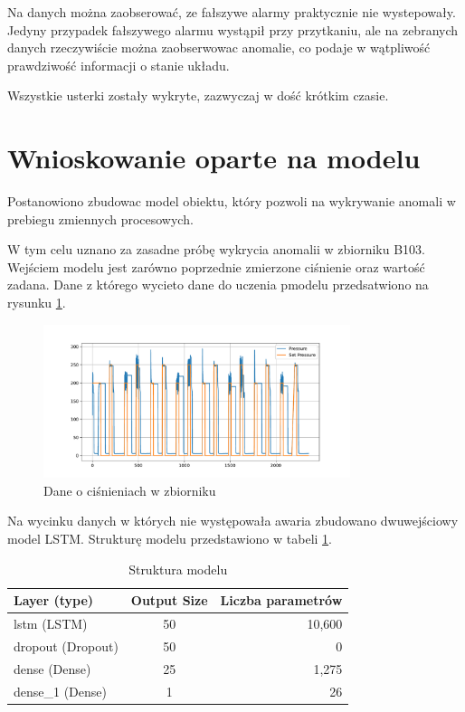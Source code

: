 \documentclass[a4paper,12pt]{article}
\begin{document}
Na danych można zaobserować, ze fałszywe alarmy praktycznie nie wystepowały. Jedyny przypadek fałszywego alarmu wystąpił przy przytkaniu, ale na zebranych danych rzeczywiście można zaobserwowac anomalie, co podaje w wątpliwość prawdziwość informacji o stanie układu.

Wszystkie usterki zostały wykryte, zazwyczaj w dość krótkim czasie.

\section{Wnioskowanie oparte na modelu}


Postanowiono zbudowac model obiektu, który pozwoli na wykrywanie anomali w prebiegu zmiennych procesowych. 

W tym celu uznano za zasadne próbę wykrycia anomalii w zbiorniku B103. Wejściem modelu jest zarówno poprzednie zmierzone ciśnienie oraz wartość zadana. Dane z którego wycieto dane do uczenia pmodelu przedsatwiono na rysunku \ref{fig:model_data}.

\begin{figure}[H]
        \centering
        \includegraphics[width=0.8\textwidth]{model_data.pdf}
        \caption{Dane o ciśnieniach w zbiorniku}
        \label{fig:model_data}
\end{figure}

Na wycinku danych w których nie występowała awaria zbudowano dwuwejściowy model LSTM. Strukturę modelu przedstawiono w tabeli \ref{tab:model_structure}. 

\begin{table}[H]
\centering
\caption{Struktura modelu}
\begin{tabular}{|l|c|r|}
\hline
\textbf{Layer (type)} & \textbf{Output Size} & \textbf{Liczba parametrów} \\
\hline
lstm (LSTM) & 50 & 10,600 \\
\hline
dropout (Dropout) & 50 & 0 \\
\hline
dense (Dense) & 25 & 1,275 \\
\hline
dense\_1 (Dense) & 1 & 26 \\
\hline
\end{tabular}
\label{tab:model_structure}
\end{table}
\end{document}
